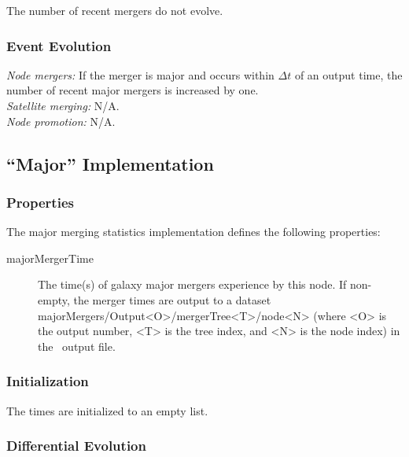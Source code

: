 The number of recent mergers do not evolve.

\subsubsection{Event Evolution}

\noindent\emph{Node mergers:} If the merger is major and occurs within $\Delta t$ of an output time, the number of recent major mergers is increased by one.\\

\noindent\emph{Satellite merging:} N/A.\\

\noindent\emph{Node promotion:} N/A.\\

\subsection{``Major'' Implementation}

\subsubsection{Properties}

The major merging statistics implementation defines the following properties:
\begin{description}
 \item [{\normalfont \ttfamily majorMergerTime}] The time(s) of galaxy major mergers experience by this node. If non-empty, the merger times are output to a dataset {\normalfont \ttfamily majorMergers/Output\textless O\textgreater/mergerTree\textless T\textgreater/node\textless N\textgreater} (where {\normalfont \ttfamily \textless O\textgreater} is the output number, {\normalfont \ttfamily \textless T\textgreater} is the tree index, and {\normalfont \ttfamily \textless N\textgreater} is the node index) in the \glc\ output file.
\end{description}

\subsubsection{Initialization}

The times are initialized to an empty list.

\subsubsection{Differential Evolution}

